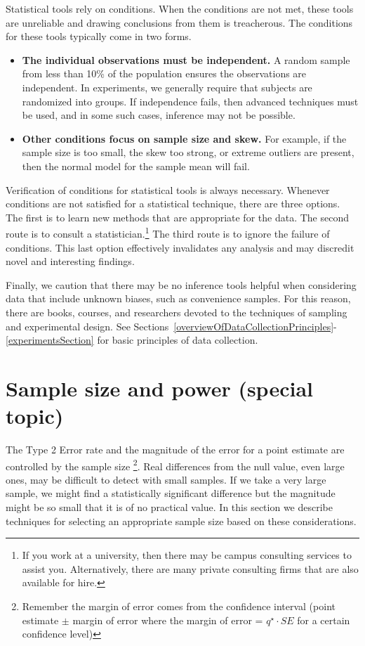 Statistical tools rely on conditions. When the conditions are not met, these tools are unreliable and drawing conclusions from them is treacherous. The conditions for these tools typically come in two forms.
\begin{itemize}
\setlength{\itemsep}{0mm}
\item \textbf{The individual observations must be independent.} A random sample from less than 10\% of the population ensures the observations are independent. In experiments, we generally require that subjects are randomized into groups. If independence fails, then advanced techniques must be used, and in some such cases, inference may not be possible.
\item \textbf{Other conditions focus on sample size and skew.} For example, if the sample size is too small, the skew too strong, or extreme outliers are present, then the normal model for the sample mean will fail.
\end{itemize}
Verification of conditions for statistical tools is always necessary. Whenever conditions are not satisfied for a statistical technique, there are three options. The first is to learn new methods that are appropriate for the data. The second route is to consult a statistician.\footnote{If you work at a university, then there may be campus consulting services to assist you. Alternatively, there are many private consulting firms that are also available for hire.} The third route is to ignore the failure of conditions. This last option effectively invalidates any analysis and may discredit novel and interesting findings.

Finally, we caution that there may be no inference tools helpful when considering data that include unknown biases, such as convenience samples. For this reason, there are books, courses, and researchers devoted to the techniques of sampling and experimental design. See Sections~\ref{overviewOfDataCollectionPrinciples}-\ref{experimentsSection} for basic principles of data collection.



\section{Sample size and power (special topic)}
\label{sampleSizeAndPower}

The Type 2 Error rate and the magnitude of the error for a point estimate are controlled by the sample size \footnote{Remember the margin of error comes from the confidence interval (point estimate $\pm$ margin of error where the margin of error = $q^{\star} \cdot SE$ for a certain confidence level)}. Real differences from the null value, even large ones, may be difficult to detect with small samples. If we take a very large sample, we might find a statistically significant difference but the magnitude might be so small that it is of no practical value. In this section we describe techniques for selecting an appropriate sample size based on these considerations.

